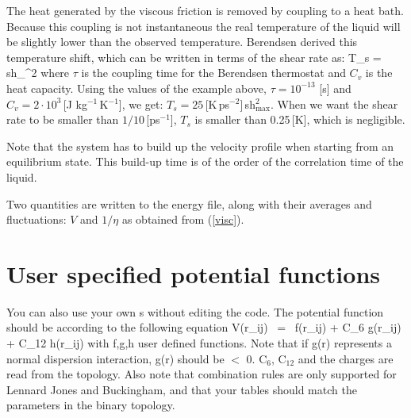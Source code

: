The heat generated by the viscous friction is removed by coupling to a heat
bath. Because this coupling is not instantaneous the real temperature of the
liquid will be slightly lower than the observed temperature.
Berendsen derived this temperature shift\cite{Berendsen91}{,} which can
be written in terms of the shear rate as:
\beq
T_s =  \mbox{sh}_{\max}^2
\eeq
where $\tau$ is the coupling time for the Berendsen thermostat and
$C_v$ is the heat capacity. Using the values of the example above,
$\tau=10^{-13}$ [s] and $C_v=2 \cdot 10^3$\,[J kg$^{-1}$\,K$^{-1}$], we
get: $T_s=25$\,[K\,ps$^{-2}$]\,sh$_{\max}^2$. When we want the shear
rate to be smaller than $1/10$\,[ps$^{-1}$], $T_s$ is smaller than
0.25\,[K], which is negligible.

Note that the system has to build up the velocity profile when starting
from an equilibrium state. This build-up time is of the order of the
correlation time of the liquid.

Two quantities are written to the energy file, along with their averages
and fluctuations: $V$ and $1/\eta$ as obtained from (\ref{visc}).

\section{User specified potential functions}
You can also use your own s 
without editing the {\gromacs} code. 
The potential function should be according to the following equation
\beq
V(r_{ij}) ~=~  f(r_{ij}) + C_6 g(r_{ij}) + C_{12} h(r_{ij})
\eeq
with f,g,h user defined functions. Note that if g(r) represents a
normal dispersion interaction, g(r) should be $<$ 0. C$_6$, C$_{12}$
and the charges are read from the topology. Also note that combination
rules are only supported for Lennard Jones and Buckingham, and that
your tables should match the parameters in the binary topology.


